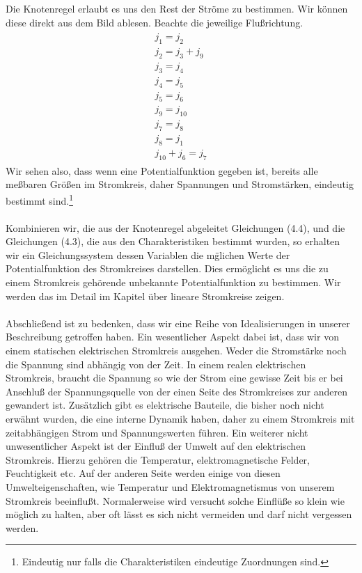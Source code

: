 \documentclass[11pt,a4paper,leqno]{report}
\numberwithin{equation}{chapter}
\begin{document}
Die Knotenregel erlaubt es uns den Rest der Str\"ome zu bestimmen. Wir k\"onnen diese direkt aus dem Bild ablesen. Beachte die jeweilige Flu\ss{}richtung.
\begin{align} 
\begin{split}
j_1 = j_2\\
j_2 = j_3 + j_9\\
j_3 = j_4\\
j_4 = j_5\\
j_5 = j_6\\
j_9 = j_{10}\\
j_7 = j_8\\
j_8 = j_1\\
j_{10} + j_6 = j_7
\end{split}
\end{align}
Wir sehen also, dass wenn eine Potentialfunktion gegeben ist, bereits alle me\ss{}baren Gr\"o\ss{}en im Stromkreis, daher Spannungen und Stromst\"arken, eindeutig bestimmt sind.\footnote{Eindeutig nur falls die Charakteristiken eindeutige Zuordnungen sind.}\\
\\
Kombinieren wir, die aus der Knotenregel abgeleitet Gleichungen (4.4), und die Gleichungen (4.3), die aus den Charakteristiken  bestimmt wurden, so erhalten wir ein Gleichungssystem dessen Variablen die m\"glichen Werte der Potentialfunktion des Stromkreises darstellen. Dies erm\"oglicht es uns die zu einem Stromkreis geh\"orende unbekannte Potentialfunktion zu bestimmen. Wir werden das im Detail im Kapitel \"uber lineare Stromkreise zeigen.
\\
\\
Abschlie\ss{}end ist zu bedenken, dass wir eine Reihe von Idealisierungen in unserer Beschreibung getroffen haben. Ein wesentlicher Aspekt dabei ist, dass wir von einem statischen elektrischen Stromkreis ausgehen. Weder die Stromst\"arke noch die Spannung sind abh\"angig von der Zeit. In einem realen elektrischen Stromkreis, braucht die Spannung so wie der Strom eine gewisse Zeit bis er bei Anschlu\ss{} der Spannungsquelle von der einen Seite des Stromkreises zur anderen gewandert ist. Zus\"atzlich gibt es elektrische Bauteile, die bisher noch nicht erw\"ahnt wurden, die eine interne Dynamik haben, daher zu einem Stromkreis mit zeitabh\"angigen Strom und Spannungswerten f\"uhren.
Ein weiterer nicht unwesentlicher Aspekt ist der Einflu\ss{} der Umwelt auf den elektrischen Stromkreis. Hierzu geh\"oren die Temperatur, elektromagnetische Felder, Feuchtigkeit etc.
Auf der anderen Seite werden einige von diesen Umwelteigenschaften, wie Temperatur und Elektromagnetismus von unserem Stromkreis beeinflu\ss{}t. Normalerweise wird versucht solche Einfl\"u\ss{}e so klein wie m\"oglich zu halten, aber oft l\"asst es sich nicht vermeiden und darf nicht vergessen werden.
\end{document}
